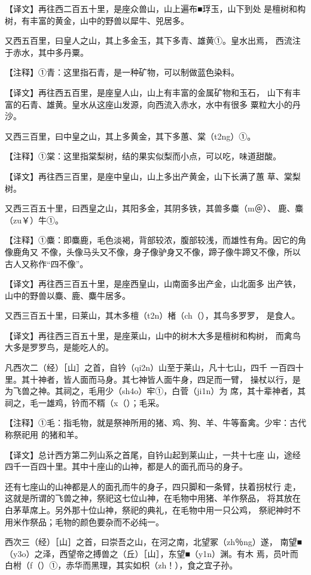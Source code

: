 \documentclass[a4paper,12pt,UTF8,twoside]{ctexbook}
\begin{document}
【译文】再往西二百五十里，是座众兽山，山上遍布■琈玉，山下到处 是檀树和构树，有丰富的黄金，山中的野兽以犀牛、兕居多。

又西五百里，曰皇人之山，其上多金玉，其下多青、雄黄①。皇水出焉， 西流注于赤水，其中多丹粟。

【注释】①青：这里指石青，是一种矿物，可以制做蓝色染料。

【译文】再往西五百里，是座皇人山，山上有丰富的金属矿物和玉石， 山下有丰富的石青、雄黄。皇水从这座山发源，向西流入赤水，水中有很多 粟粒大小的丹沙。

又西三百里，曰中皇之山，其上多黄金，其下多蕙、棠（t2ng）①。

【注释】①棠：这里指棠梨树，结的果实似梨而小点，可以吃，味道甜酸。

【译文】再往西三百里，是座中皇山，山上多出产黄金，山下长满了蕙 草、棠梨树。

又西三百五十里，曰西皇之山，其阳多金，其阴多铁，其兽多麋（m＠）、 鹿、麋（zu￥）牛①。

【注释】①麋：即麋鹿，毛色淡褐，背部较浓，腹部较浅，而雄性有角。因它的角像鹿角又 不像，头像马头又不像，身子像驴身又不像，蹄子像牛蹄又不像，所以古人又称作“四不像”。

【译文】再往西三百五十里，是座西皇山，山南面多出产金，山北面多 出产铁，山中的野兽以麋、鹿、麋牛居多。

又西三百五十里，曰莱山，其木多檀（t2n）楮（ch（），其鸟多罗罗， 是食人。

【译文】再往西三百五十里，是座莱山，山中的树木大多是檀树和构树， 而禽鸟大多是罗罗鸟，是能吃人的。

凡西次二（经）［山］之首，自钤（qi2n）山至于莱山，凡十七山，四千 一百四十里。其十神者，皆人面而马身。其七神皆人面牛身，四足而一臂， 操杖以行，是为飞兽之神。其祠之，毛用少（sh4o）牢①，白菅（ji1n）为 席，其十辈神者，其祠之，毛一雄鸡，钤而不糈（x（）；毛采。

【注释】①毛：指毛物，就是祭神所用的猪、鸡、狗、羊、牛等畜禽。少牢：古代称祭祀用 的猪和羊。

【译文】总计西方第二列山系之首尾，自钤山起到莱山止，一共十七座 山，途经四千一百四十里。其中十座山的山神，都是人的面孔而马的身子。

还有七座山的山神都是人的面孔而牛的身子，四只脚和一条臂，扶着拐杖行 走，这就是所谓的飞兽之神，祭祀这七位山神，在毛物中用猪、羊作祭品， 将其放在白茅草席上。另外那十位山神，祭祀的典礼，在毛物中用一只公鸡， 祭祀神时不用米作祭品；毛物的颜色要杂而不必纯一。

西次三（经）［山］之首，曰崇吾之山，在河之南，北望冢（zh％ng）遂， 南望■（y3o）之泽，西望帝之搏兽之（丘）［山］，东望■（y1n）渊。有木 焉，员叶而白柎（f（）①，赤华而黑理，其实如枳（zh！），食之宜子孙。
\end{document}
